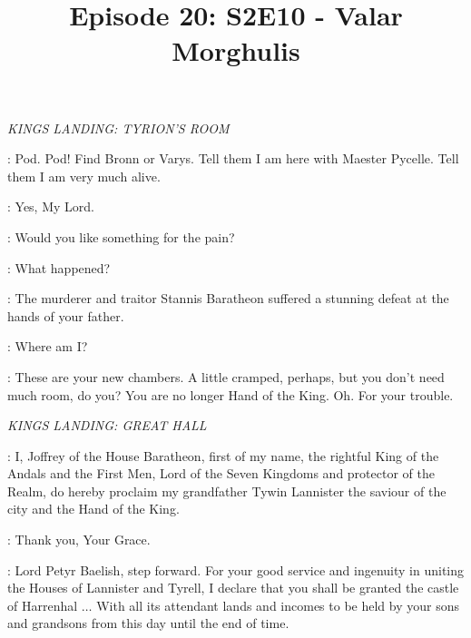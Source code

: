 

\title{Episode 20: S2E10 - Valar Morghulis}
\author{}
\date{}
\maketitle



\scene

\textit{KINGS LANDING: TYRION'S ROOM} 


\TYRION: Pod. Pod!  Find Bronn or Varys. Tell them I am here with Maester Pycelle. Tell them I am very much alive. 

\PODRICK: Yes, My Lord. 

\PYCELLE: Would you like something for the pain? 

\TYRION: What happened? 

\PYCELLE: The murderer and traitor Stannis Baratheon suffered a stunning defeat at the hands of your father. 

\TYRION: Where am I? 

\PYCELLE: These are your new chambers. A little cramped, perhaps, but you don't need much room, do you? You are no longer Hand of the King. Oh. For your trouble. 



\scene

\textit{KINGS LANDING: GREAT HALL} 


\JOFFREY: I, Joffrey of the House Baratheon, first of my name, the rightful King of the Andals and the First Men, Lord of the Seven Kingdoms and protector of the Realm, do hereby proclaim my grandfather Tywin Lannister the saviour of the city and the Hand of the King. 

\TYWIN: Thank you, Your Grace. 

\JOFFREY: Lord Petyr Baelish, step forward. For your good service and ingenuity in uniting the Houses of Lannister and Tyrell, I declare that you shall be granted the castle of Harrenhal $\ldots$ With all its attendant lands and incomes to be held by your sons and grandsons from this day until the end of time. 

